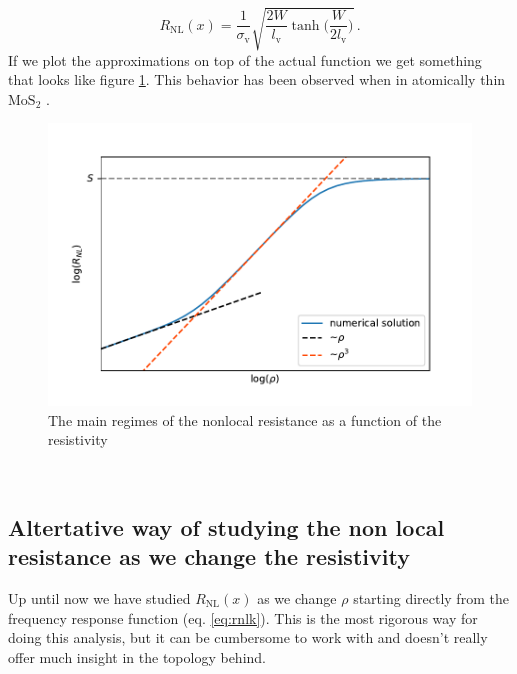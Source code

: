\[
    R_{\textrm{NL}}(x) = \frac 1{\sigma_{\textrm{v}}}\sqrt{\frac {2W}{l_{\textrm{v}}}\tanh\bigg(\frac W{2l_{\textrm{v}}} \bigg)}\,.
\]
If we plot the approximations on top of the actual function we get something that looks like figure \ref{fig:all_approx_rho}. This behavior has been observed when in atomically thin $\textrm{MoS}_2$ \cite{wu2019intrinsic}.
\begin{figure}[h!]
    \centering
    \includegraphics[width=\linewidth]{Immagini/rnl/all_approx_rho.pdf}
    \caption{The main regimes of the nonlocal resistance as a function of the resistivity}
    \label{fig:all_approx_rho}
\end{figure}\\

\subsection{Altertative way of studying the non local resistance as we change the resistivity}
\label{sec:alternaterho}
Up until now we have studied $R_{\textrm{NL}}(x)$ as we change $\rho$ starting directly from the frequency response function (eq. \ref{eq:rnlk}). This is the most rigorous way for doing this analysis, but it can be cumbersome to work with and doesn't really offer much insight in the topology behind.

